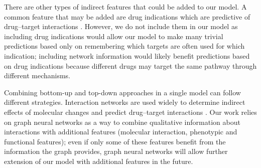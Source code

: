\documentclass{bioinfo}
\renewcommand{\cite}{\citep}
\begin{document}

There are other types of indirect features that could be added to our
model. A common feature that may be added are drug indications which
are predictive of drug--target interactions \cite{Gottlieb2011}.
However, we do not include them in our model as including drug
indications would allow our model to make many trivial predictions
based only on remembering which targets are often used for which
indication; including network information would likely benefit
predictions based on drug indications because different drugs may
target the same pathway through different mechanisms.

Combining bottom-up and top-down approaches in a single model can
follow different strategies. Interaction networks are used widely to
determine indirect effects of molecular changes and predict
drug--target interactions \cite{LotfiShahreza2017}. Our work relies on
graph neural networks as a way to combine qualitative information
about interactions with additional features (molecular interaction,
phenotypic and functional features); even if only some of these
features benefit from the information the graph provides, graph neural
networks will allow further extension of our model with additional
features in the future.







\end{document}
